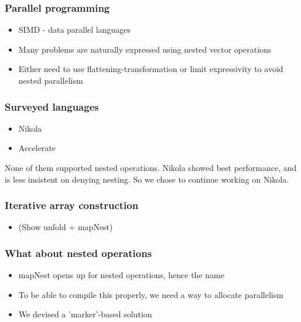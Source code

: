 \documentclass[a4paper]{beamer}
\begin{document}
\begin{frame}
  \frametitle{Parallel programming}
  \begin{itemize}
    \item SIMD - data parallel languages
    \item Many problems are naturally expressed using nested vector operations
    \item Either need to use flattening-transformation or limit expressivity to avoid nested parallelism
  \end{itemize}
\end{frame}

\begin{frame}
  \frametitle{Surveyed languages}

  \begin{itemize}
    \item Nikola
    \item Accelerate
  \end{itemize}

  None of them supported nested operations. Nikola showed best performance, and
  is less insistent on denying nesting. So we chose to continue working on Nikola.

\end{frame}

\begin{frame}
  \frametitle{Iterative array construction}

  \begin{itemize}
    \item (Show unfold + mapNest)
  \end{itemize}

\end{frame}

\begin{frame}
  \frametitle{What about nested operations}

  \begin{itemize}
    \item mapNest opens up for nested operations, hence the name
    \item To be able to compile this properly, we need a way to allocate parallelism
    \item We devised a 'marker'-based solution
  \end{itemize}

\end{frame}
\end{document}
